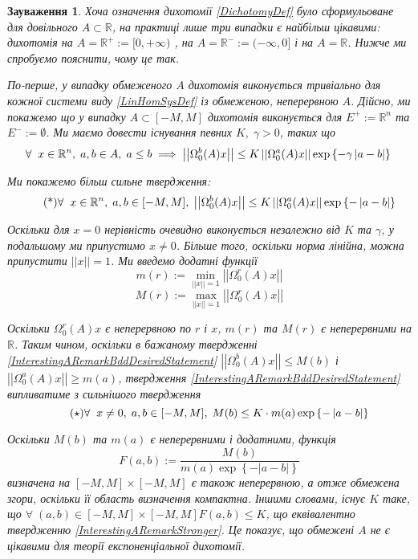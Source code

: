 \documentclass[14pt]{extarticle} %
\let\oldmin\min
\renewcommand{\min}{\displaystyle\oldmin}
\let\oldmax\max
\renewcommand{\max}{\displaystyle\oldmax}
\let\oldforall\forall
\renewcommand{\forall}{\oldforall\;}
\newcommand{\mynorm}[1]{\left|\left|#1\right|\right|}
\newcommand{\myabs}[1]{\left|#1\right|}
\newtheorem{remark}{Зауваження}
\begin{document}
\begin{remark}
	Хоча означення дихотомії \ref{DichotomyDef} було сформульоване для довільного $A\subset\mathbb{R}$, на практиці лише три випадки є 
	найбільш цікавими: дихотомія на $A=\mathbb{R}^+:=[0,+\infty)$
	, на $A=\mathbb{R}^-:=(-\infty,0]$ і на $A=\mathbb{R}$. Нижче ми спробуємо пояснити, чому це так.

	По-перше, у випадку обмеженого $A$ дихотомія виконується тривіально для кожної системи виду \ref{LinHomSysDef} із обмеженою, неперервною
	$A$. Дійсно, ми покажемо що у випадку $A\subset[-M,M]$ дихотомія виконується для $E^+:=\mathbb{R}^n$ та $E^-:=\emptyset$. Ми маємо
	довести існування певних $K,\;\gamma>0$, таких що
	\[\forall x\in\mathbb{R}^n,\;a,b\in A,\;a\leq b\implies 
	\mynorm{\Omega^b_0(A){x}}\leq K\mynorm{\Omega_0^a(A){x}}\exp\left\{-\gamma\myabs{a-b}\right\}\\
	\]

	Ми покажемо більш сильне твердження:
	\[\tag{*}\label{InterestingARemarkBddDesiredStatement}
	\forall x\in\mathbb{R}^n,\;a,b\in [-M,M],\;
	\mynorm{\Omega^b_0(A){x}}\leq K\mynorm{\Omega_0^a(A){x}}\exp\left\{-\myabs{a-b}\right\}\\
	\]
	
	Оскільки для $x=0$ нерівність очевидно виконується незалежно від $K$ та $\gamma$, у подальшому ми припустимо $x\neq 0$. Більше того,
	оскільки норма лінійна, можна припустити $\mynorm{x}=1$. Ми введемо додатні функції
	\[m(r):=\min_{\mynorm{x}=1}\mynorm{\Omega^r_0(A)x}\]
	\[M(r):=\max_{\mynorm{x}=1}\mynorm{\Omega^r_0(A)x}\]
	
	Оскільки $\Omega_0^r(A)x$ є неперервною по $r$ і $x$, $m(r)$ та $M(r)$ є неперервними на $\mathbb{R}$. Таким чином, оскільки в 
	бажаному твердженні \ref{InterestingARemarkBddDesiredStatement} $\mynorm{\Omega^b_0(A)x}\leq M(b)$ і $\mynorm{\Omega^a_0(A)x}
	\geq m(a)$, твердження \ref{InterestingARemarkBddDesiredStatement} випливатиме з сильнішого твердження
	\[\tag{$\star$}\label{InterestingARemarkStronger}
	\forall x\neq 0,\;a,b\in [-M,M],\;
	M(b)\leq K\cdot m(a)\exp\left\{-\myabs{a-b}\right\}\\
	\]

	Оскільки $M(b)$ та $m(a)$ є неперервними і додатними, функція 
	\[F(a,b):=\frac{M(b)}{m(a)\exp\left\{-\myabs{a-b}\right\}}\]
	визначена на $[-M,M]\times[-M,M]$ є також неперервною, а отже обмежена згори, оскільки її область визначення компактна. Іншими словами,
	існує $K$ таке, що $\forall (a,b)\in[-M,M]\times[-M,M] F(a,b)\leq K$, що еквівалентно твердженню
	\ref{InterestingARemarkStronger}. Це показує, що обмежені $A$ не є цікавими для теорії експоненціальної дихотомії.


\end{remark}
\end{document}
